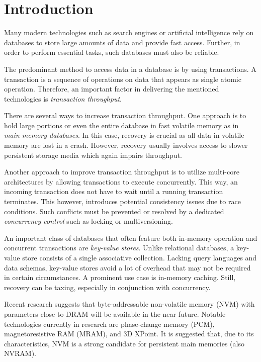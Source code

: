 \chapter{Introduction}
\label{ch:intro}



Many modern technologies such as search engines or artificial intelligence rely
on databases to store large amounts of data and provide fast access. Further,
in order to perform essential tasks, such databases must also be reliable.

The predominant method to access data in a database is by using transactions. A
transaction is a sequence of operations on data that appears as single atomic
operation. Therefore, an important factor in delivering the mentioned
technologies is \textit{transaction throughput}.

There are several ways to increase transaction throughput. One approach is to
hold large portions or even the entire database in fast volatile memory as 
in \textit{main-memory databases}. In this case, recovery is crucial as
all data in volatile memory are lost in a crash. However, recovery usually
involves access to slower persistent storage media which again impairs
throughput.

Another approach to improve transaction throughput is to utilize multi-core
architectures by allowing transactions to execute concurrently. This way, an
incoming transaction does not have to wait until a running transaction
terminates. This however, introduces potential consistency issues due to race
conditions. Such conflicts must be prevented or resolved by a dedicated
\textit{concurrency control} such as locking or multiversioning.

An important class of databases that often feature both in-memory operation and
concurrent transactions are \textit{key-value stores}. Unlike relational
databases, a key-value store consists of a single associative collection.
Lacking query languages and data schemas, key-value stores avoid a lot of
overhead that may not be required in certain circumstances. A prominent use 
case is in-memory caching. Still, recovery can be taxing, especially in 
conjunction with concurrency.


Recent research suggests that byte-addressable non-volatile memory (NVM) with
parameters close to DRAM will be available in the near future. Notable
technologies currently in research are phase-change memory (PCM),
magnetoresistive RAM (MRAM), and 3D XPoint. It is suggested that, due to its
characteristics, NVM is a strong candidate for persistent main memories (also
NVRAM).

